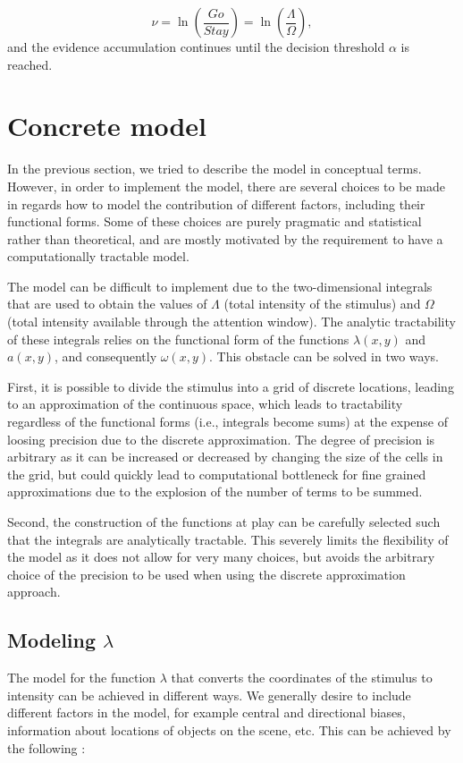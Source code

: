\documentclass{article}
\begin{document}
$$\nu = \ln\left(\frac{Go}{Stay}\right) = \ln\left(\frac{\Lambda}{\Omega}\right),$$
and the evidence accumulation continues until the decision threshold $\alpha$ is reached.

\section{Concrete model}

In the previous section, we tried to describe the model in conceptual terms. However, in order to implement the model, there are several choices to be made in regards how to model the contribution of different factors, including their functional forms. Some of these choices are purely pragmatic and statistical rather than theoretical, and are mostly motivated by the requirement to have a computationally tractable model.

The model can be difficult to implement due to the two-dimensional integrals that are used to obtain the values of $\Lambda$ (total intensity of the stimulus) and $\Omega$ (total intensity available through the attention window). The analytic tractability of these integrals relies on the functional form of the functions $\lambda(x, y)$ and $a(x, y)$, and consequently $\omega(x, y)$. This obstacle can be solved in two ways. 

First, it is possible to divide the stimulus into a grid of discrete locations, leading to an approximation of the continuous space, which leads to tractability regardless of the functional forms (i.e., integrals become sums) at the expense of loosing precision due to the discrete approximation. The degree of precision is arbitrary as it can be increased or decreased by changing the size of the cells in the grid, but could quickly lead to computational bottleneck for fine grained approximations due to the explosion of the number of terms to be summed.

Second, the construction of the functions at play can be carefully selected such that the integrals are analytically tractable. This severely limits the flexibility of the model as it does not allow for very many choices, but avoids the arbitrary choice of the precision to be used when using the discrete approximation approach.


\subsection{Modeling $\lambda$}

The model for the function $\lambda$ that converts the coordinates of the stimulus to intensity can be achieved in different ways. We generally desire to include different factors in the model, for example central and directional biases, information about locations of objects on the scene, etc. This can be achieved by the following \citep{barthelme2013spatial}:
\end{document}
